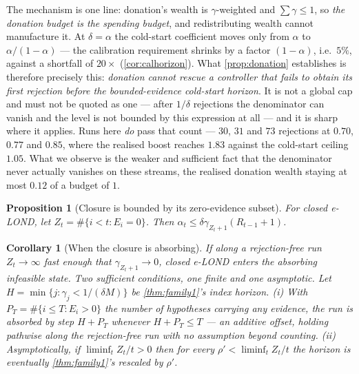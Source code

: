 \documentclass[conference]{IEEEtran}
\newtheorem{proposition}[theorem]{Proposition}
\newtheorem{corollary}[theorem]{Corollary}
\newcommand{\ceil}{M}
\newcommand{\alphat}{\alpha_t}
\begin{document}
The mechanism is one line: donation's wealth is $\gamma$-weighted and $\sum\gamma\le1$, so \emph{the
donation budget is the spending budget}, and redistributing wealth cannot manufacture it. At
$\delta=\alpha$ the cold-start coefficient moves only from $\alpha$ to $\alpha/(1-\alpha)$ --- the
calibration requirement shrinks by a factor $(1-\alpha)$, i.e.\ $5\%$, against a shortfall of
$20\times$ (\cref{cor:calhorizon}). What \cref{prop:donation} establishes is therefore precisely this: \emph{donation cannot rescue a
controller that fails to obtain its first rejection before the bounded-evidence cold-start horizon}. It
is not a global cap and must not be quoted as one --- after $1/\delta$ rejections the denominator can
vanish and the level is not bounded by this expression at all --- and it is sharp where it applies. Runs here \emph{do} pass that
count --- $30$, $31$ and $73$ rejections at $0.70$, $0.77$ and $0.85$, where the realised boost
reaches $1.83$ against the cold-start ceiling $1.05$. What we observe is the weaker and sufficient
fact that the denominator never actually vanishes on these streams, the realised donation wealth
staying at most $0.12$ of a budget of $1$.

\begin{proposition}[Closure is bounded by its zero-evidence subset]\label{prop:closure}
For closed e-LOND, let $Z_t = \#\{i<t : E_i = 0\}$. Then $\alphat \le \delta\gamma_{Z_t+1}(R_{t-1}+1)$.
\end{proposition}

\begin{corollary}[When the closure is absorbing]\label{cor:closureabsorb}
If along a rejection-free run $Z_t\to\infty$ fast enough that $\gamma_{Z_t+1}\to0$, closed e-LOND
enters the absorbing infeasible state. Two sufficient conditions, one finite and one asymptotic. Let
$H = \min\{j:\gamma_j < 1/(\delta\ceil)\}$ be \cref{thm:family1}'s index horizon.
\emph{(i)} With $P_T = \#\{i\le T: E_i>0\}$ the number of hypotheses carrying \emph{any} evidence,
the run is absorbed by step $H + P_T$ whenever $H+P_T\le T$ --- an \emph{additive} offset, holding
pathwise along the rejection-free run with no assumption beyond counting.
\emph{(ii)} Asymptotically, if $\liminf_t Z_t/t > 0$ then for \emph{every}
$\rho'<\liminf_t Z_t/t$ the horizon is eventually \cref{thm:family1}'s rescaled by $\rho'$.
\end{corollary}
\end{document}
